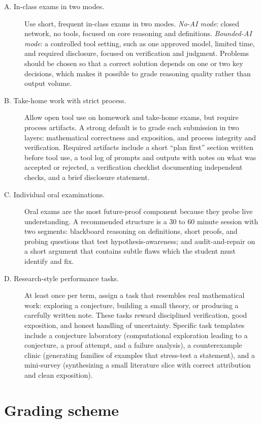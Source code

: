 \documentclass{SIAMbook2023}
\begin{document}
\begin{description}
\item[A. In-class exams in two modes.] Use short, frequent in-class exams in two modes. \emph{No-AI mode}: closed network, no tools, focused on core reasoning and definitions. \emph{Bounded-AI mode}: a controlled tool setting, such as one approved model, limited time, and required disclosure, focused on verification and judgment. Problems should be chosen so that a correct solution depends on one or two key decisions, which makes it possible to grade reasoning quality rather than output volume.

\item[B. Take-home work with strict process.] Allow open tool use on homework and take-home exams, but require process artifacts. A strong default is to grade each submission in two layers: mathematical correctness and exposition, and process integrity and verification. Required artifacts include a short ``plan first'' section written before tool use, a tool log of prompts and outputs with notes on what was accepted or rejected, a verification checklist documenting independent checks, and a brief disclosure statement.

\item[C. Individual oral examinations.] Oral exams are the most future-proof component because they probe live understanding. A recommended structure is a 30 to 60 minute session with two segments: blackboard reasoning on definitions, short proofs, and probing questions that test hypothesis-awareness; and audit-and-repair on a short argument that contains subtle flaws which the student must identify and fix.

\item[D. Research-style performance tasks.] At least once per term, assign a task that resembles real mathematical work: exploring a conjecture, building a small theory, or producing a carefully written note. These tasks reward disciplined verification, good exposition, and honest handling of uncertainty. Specific task templates include a conjecture laboratory (computational exploration leading to a conjecture, a proof attempt, and a failure analysis), a counterexample clinic (generating families of examples that stress-test a statement), and a mini-survey (synthesizing a small literature slice with correct attribution and clean exposition).
\end{description}

\section{Grading scheme}
\end{document}

